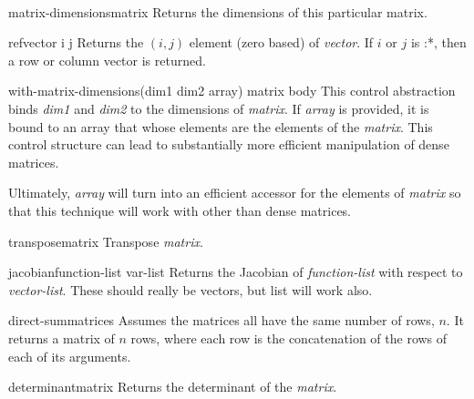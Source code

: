 \begin{flushleft}
 \\
\end{flushleft}

\begin{functiondef}{matrix-dimensions}{matrix}
Returns the dimensions of this particular matrix.
\end{functiondef}

\begin{functiondef}{ref}{vector i j}
Returns the $(i,j)$ element (zero based) of {\em vector\/}.  If $i$ or
$j$ is {\sf :*}, then a row or column vector is returned.
\end{functiondef}

\begin{functiondef}{with-matrix-dimensions}{(dim1 dim2 \optional array)
matrix \body body}
This control abstraction binds {\em dim1} and {\em dim2} to the
dimensions of {\em matrix}.  If {\em array} is provided, it is bound
to an array that whose elements are the elements of the {\em
matrix\/}.  This control structure can lead to substantially more
efficient manipulation of dense matrices.  

Ultimately, {\em array} will turn into an efficient accessor for the
elements of {\em matrix} so that this technique will work with other
than dense matrices.
\end{functiondef}

\begin{functiondef}{transpose}{matrix}
Transpose {\em matrix\/}.
\end{functiondef}

\begin{functiondef}{jacobian}{function-list var-list}
Returns the Jacobian of {\em function-list} with respect to {\em
vector-list}.  These should really be vectors, but list will work
also.   
\end{functiondef}

\begin{functiondef}{direct-sum}{\rest matrices}
Assumes the matrices all have the same
number of rows, $n$.  It returns a matrix of $n$ rows, where
each row is the concatenation of the rows of each of
its arguments.
\end{functiondef}

\begin{functiondef}{determinant}{matrix}
Returns the determinant of the {\em matrix}.
\end{functiondef}
  

